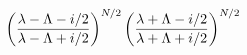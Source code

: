 \begin{equation}
\left({\lambda-\Lambda-i/2\over \lambda-\Lambda+i/2}\right)^{N/2}
\left({\lambda+\Lambda-i/2\over \lambda+\Lambda+i/2}\right)^{N/2}
\end{equation}

